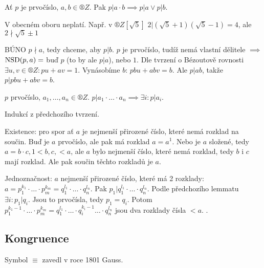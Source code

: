 \documentclass[12pt]{article}                   %
\begin{document}
        \begin{lemma}
            Ať $p$ je prvočíslo, $a, b \in ®Z$. Pak $p|a·b \implies p|a \lor p|b$.

            \begin{poznamkain}
                V obecném oboru neplatí. Např. v $®Z[\sqrt{5}]$ $2|(\sqrt{5} + 1)(\sqrt{5} - 1) = 4$, ale $2\nmid\sqrt{5} ± 1$
            \end{poznamkain}

            \begin{dukazin}
                BÚNO $p \nmid a$, tedy chceme, aby $p|b$. $p$ je prvočíslo, tudíž nemá vlastní dělitele $\implies$ $\operatorname{NSD}(p, a) = $ buď $p$ (to by ale $p|a$), nebo $1$. Dle tvrzení o Bézoutově rovnosti $\exists u, v \in ®Z: pu+av = 1$. Vynásobíme $b$: $pbu + abv = b$. Ale $p | ab$, takže $p | pbu + abv = b$.
            \end{dukazin}
        \end{lemma}

        \begin{lemma}
            $p$ prvočíslo, $a_1, …, a_n \in ®Z$. $p|a_1 · … · a_n \implies \exists i: p | a_i$.

            \begin{dukazin}
                Indukcí z předchozího tvrzení.
            \end{dukazin}
        \end{lemma}

        \begin{dukaz}
            Existence: pro spor ať $a$ je nejmenší přirozené číslo, které nemá rozklad na součin. Buď je $a$ prvočíslo, ale pak má rozklad $a = a^1$. Nebo je $a$ složené, tedy $a=b·c, 1 < b, c, < a$, ale $a$ bylo nejmenší číslo, které nemá rozklad, tedy $b$ i $c$ mají rozklad. Ale pak součin těchto rozkladů je $a$.

            Jednoznačnost: $a$ nejmenší přirozené číslo, které má 2 rozklady: $a = p_1^{k_1} · … · p_m^{k_m} = q_1^{l_1}·…·q_n^{l_n}$. Pak $p_1 | q_1^{l_1}·…·q_n^{l_n}$. Podle předchozího lemmatu $\exists i: p_1 | q_i$. Jsou to prvočísla, tedy $p_1 = q_i$. Potom $p_1^{k_1-1} · … · p_m^{k_m} = q_1^{l_1}·…·q_i^{k_i - 1}…·q_n^{l_n}$ jsou dva rozklady čísla $< a$. \lightning.
        \end{dukaz}

    \subsection{Kongruence}
        \begin{poznamka}[Historie]
            Symbol $≡$ zavedl v roce 1801 Gauss.
        \end{poznamka}
\end{document}
